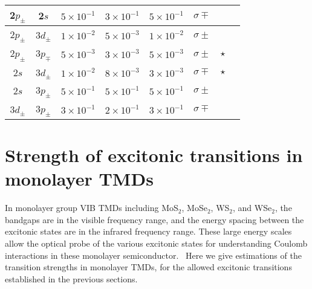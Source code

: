 \documentclass[prb,twocolumn,amsmath,amssymb,superscriptaddress,showpacs]{revtex4}
\begin{document}
\begin{table}
\begin{ruledtabular}
\begin{tabular}{ c | c | c | c | c | c | c  c}
                             2$p_{\pm}$ &             2$s$          & $5\times10^{-1}$        &  $3\times10^{-1}$   &  $5\times10^{-1}$   &  $\sigma\mp$ &  \\ \hline
                 2$p_{\pm}$       &              3$d_{\pm}$        & $1\times10^{-2}$        &  $5\times10^{-3}$   &  $1\times10^{-2}$   &  $\sigma\pm$ & \\ \hline
                 2$p_{\pm}$       &              3$p_{\mp}$     & $5\times10^{-3}$           &  $3\times10^{-3}$   &  $5\times10^{-3}$   &  $\sigma\pm$ & $\star$\\ \hline
                           2$s$        &             3$d_{\pm}$          & $1\times10^{-2}$        &  $8\times10^{-3}$   &  $3\times10^{-3}$   & $\sigma\mp$ &  $\star$\\ \hline
                           2$s$        &             3$p_{\pm}$        & $5\times10^{-1}$          &  $5\times10^{-1}$   &  $5\times10^{-1}$   &  $\sigma\pm$ & \\ \hline
                  3$d_{\pm}$      &             3$p_{\pm}$        & $3\times10^{-1}$         &  $2\times10^{-1}$  & $3\times10^{-1}$   &  $\sigma\mp$ & \\
\end{tabular}
\end{ruledtabular}
\end{table}


\section{Strength of excitonic transitions in monolayer TMDs \label{sectionTMDs}}

In monolayer group VIB  TMDs including MoS$_2$, MoSe$_2$, WS$_2$, and WSe$_2$, the bandgaps are in the visible frequency range, and the energy spacing between the excitonic states are in the  infrared frequency range. These large energy scales allow the optical probe of the various excitonic states for understanding Coulomb interactions in these monolayer semiconductor.~\cite{Heinz binding energy PRL2014, Jie Shan binding energy PRL2014, X Zhang S Louie TPA  2014, XD Cui TPA 2014, Urbaszek TPA and SHG PRL2015, Exciton 1s-2p TMDs nmat2015}
Here we give estimations of the transition strengths in monolayer TMDs, for the allowed excitonic transitions established in the previous sections.
\end{document}
